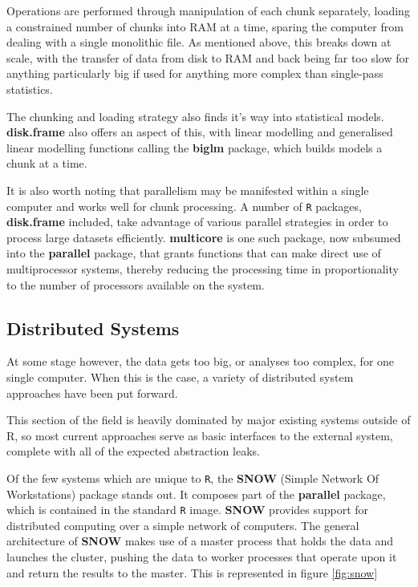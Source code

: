 

Operations are performed through manipulation of each chunk separately, loading a constrained number of chunks into RAM at a time, sparing the computer from dealing with a single monolithic file\cite{zj19:_inges_data}.
As mentioned above, this breaks down at scale, with the transfer of data from disk to RAM and back being far too slow for anything particularly big if used for anything more complex than single-pass statistics.

The chunking and loading strategy also finds it's way into statistical models.
\textbf{disk.frame} also offers an aspect of this, with linear modelling and generalised linear modelling functions calling the \textbf{biglm} package, which builds models a chunk at a time\cite{lumley13}.

It is also worth noting that parallelism may be manifested within a single computer and works well for chunk processing.
A number of \texttt{R} packages, \textbf{disk.frame} included, take advantage of various parallel strategies in order to process large datasets efficiently.
\textbf{multicore} is one such package, now subsumed into the \textbf{parallel} package, that grants functions that can make direct use of multiprocessor systems, thereby reducing the processing time in proportionality to the number of processors available on the system\cite{team20:_r}.

\subsection{Distributed Systems}

At some stage however, the data gets too big, or analyses too complex, for one single computer.
When this is the case, a variety of distributed system approaches have been put forward.

This section of the field is heavily dominated by major existing systems outside of R, so most current approaches serve as basic interfaces to the external system, complete with all of the expected abstraction leaks\cite{spolsky2002abstraction}.

Of the few systems which are unique to \texttt{R}, the \textbf{SNOW} (Simple Network Of Workstations) package stands out.
It composes part of the \textbf{parallel} package, which is contained in the standard \texttt{R} image\cite{tierney18}.
\textbf{SNOW} provides support for distributed computing over a simple network of computers.
The general architecture of \textbf{SNOW} makes use of a master process that holds the data and launches the cluster, pushing the data to worker processes that operate upon it and return the results to the master.
This is represented in figure \ref{fig:snow}

